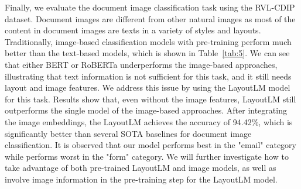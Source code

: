 \documentclass[sigconf]{acmart}
\begin{document}
Finally, we evaluate the document image classification task using the RVL-CDIP dataset. Document images are different from other natural images as most of the content in document images are texts in a variety of styles and layouts. Traditionally, image-based classification models with pre-training perform much better than the text-based models, which is shown in Table~\ref{tab:5}. We can see that either BERT or RoBERTa underperforms the image-based approaches, illustrating that text information is not sufficient for this task, and it still needs layout and image features. We address this issue by using the LayoutLM model for this task. Results show that, even without the image features, LayoutLM still outperforms the single model of the image-based approaches. After integrating the image embeddings, the LayoutLM achieves the accuracy of 94.42\%, which is significantly better than several SOTA baselines for document image classification. It is observed that our model performs best in the "email" category while performs worst in the "form" category. We will further investigate how to take advantage of both pre-trained LayoutLM and image models, as well as involve image information in the pre-training step for the LayoutLM model.
\end{document}
